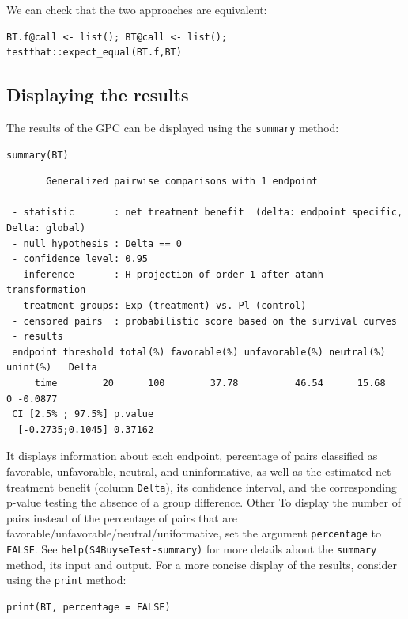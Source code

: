 \documentclass[12pt]{article}
\begin{document}
We can check that the two approaches are equivalent:
\lstset{language=r,label= ,caption= ,captionpos=b,numbers=none}
\begin{lstlisting}
BT.f@call <- list(); BT@call <- list();
testthat::expect_equal(BT.f,BT)
\end{lstlisting}

\subsection{Displaying the results}
\label{sec:orgf3d0dda}

The results of the GPC can be displayed using the \texttt{summary} method:
\lstset{language=r,label= ,caption= ,captionpos=b,numbers=none}
\begin{lstlisting}
summary(BT)
\end{lstlisting}

\begin{verbatim}
       Generalized pairwise comparisons with 1 endpoint

 - statistic       : net treatment benefit  (delta: endpoint specific, Delta: global) 
 - null hypothesis : Delta == 0 
 - confidence level: 0.95 
 - inference       : H-projection of order 1 after atanh transformation 
 - treatment groups: Exp (treatment) vs. Pl (control) 
 - censored pairs  : probabilistic score based on the survival curves
 - results
 endpoint threshold total(%) favorable(%) unfavorable(%) neutral(%) uninf(%)   Delta
     time        20      100        37.78          46.54      15.68        0 -0.0877
 CI [2.5% ; 97.5%] p.value 
  [-0.2735;0.1045] 0.37162
\end{verbatim}


It displays information about each endpoint, percentage of pairs
classified as favorable, unfavorable, neutral, and uninformative, as
well as the estimated net treatment benefit (column \texttt{Delta}), its confidence
interval, and the corresponding p-value testing the absence of a group
difference. Other To display the number of pairs instead of the
percentage of pairs that are
favorable/unfavorable/neutral/uniformative, set the argument
\texttt{percentage} to \texttt{FALSE}. See \texttt{help(S4BuyseTest-summary)} for more
details about the \texttt{summary} method, its input and output. For a more
concise display of the results, consider using the \texttt{print} method:
\lstset{language=r,label= ,caption= ,captionpos=b,numbers=none}
\begin{lstlisting}
print(BT, percentage = FALSE)
\end{lstlisting}
\end{document}
